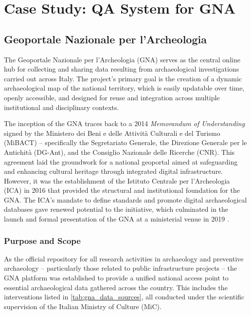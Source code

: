 \chapter{Case Study: QA System for GNA}
\label{chap:casestudy}
\sloppy
\begin{spacing}{1.5} 

\section{Geoportale Nazionale per l’Archeologia}
The Geoportale Nazionale per l'Archeologia (GNA) \citep{mic_mic_2019} serves as the central online hub for collecting and sharing data resulting from archaeological investigations carried out across Italy. The project's primary goal is the creation of a dynamic archaeological map of the national territory, which is easily updatable over time, openly accessible, and designed for reuse and integration across multiple institutional and disciplinary contexts.

The inception of the GNA traces back to a 2014 \textit{Memorandum of Understanding} signed by the Ministero dei Beni e delle Attività Culturali e del Turismo (MiBACT) -- specifically the Segretariato Generale, the Direzione Generale per le Antichità (DG-Ant), and the Consiglio Nazionale delle Ricerche (CNR). This agreement laid the groundwork for a national geoportal aimed at safeguarding and enhancing cultural heritage through integrated digital infrastructure. However, it was the establishment of the Istituto Centrale per l’Archeologia (ICA) in 2016 that provided the structural and institutional foundation for the GNA. The ICA’s mandate to define standards and promote digital archaeological databases gave renewed potential to the initiative, which culminated in the launch and formal presentation of the GNA at a ministerial venue in 2019 \citep{calandra_il_2023}.

\subsection{Purpose and Scope}
As the official repository for all research activities in archaeology and preventive archaeology -- particularly those related to public infrastructure projects -- the GNA platform was established to provide a unified national access point to essential archaeological data gathered across the country. This includes the interventions listed in \autoref{tab:gna_data_sources}, all conducted under the scientific supervision of the Italian Ministry of Culture (MiC).


\end{spacing}
